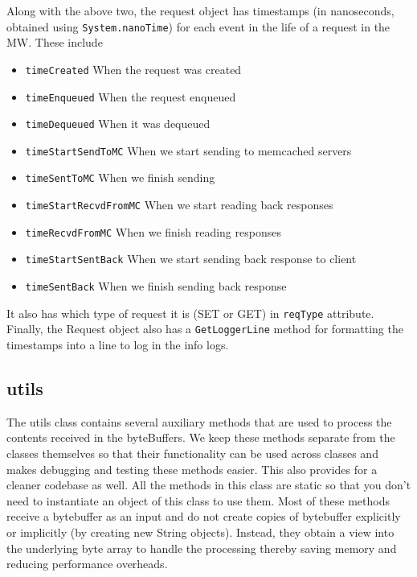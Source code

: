 \documentclass[11pt,a4paper]{article}
\begin{document}
Along with the above two, the request object 	has timestamps (in nanoseconds, obtained using \texttt{System.nanoTime}) for each event in the life of a request in the MW. These include
\begin{itemize}
	  \setlength{\itemsep}{0pt}
	  \setlength{\parskip}{0pt}
	  \setlength{\parsep}{0pt}
	\item \texttt{timeCreated} When the request was created
	\item \texttt{timeEnqueued} When the request enqueued
	\item \texttt{timeDequeued} When it was dequeued
	\item \texttt{timeStartSendToMC} When we start sending to memcached servers
	\item \texttt{timeSentToMC} When we finish sending
	\item \texttt{timeStartRecvdFromMC} When we start reading back responses
	\item \texttt{timeRecvdFromMC} When we finish reading responses
	\item \texttt{timeStartSentBack} When we start sending back response to client 
	\item \texttt{timeSentBack} When we finish sending back response
\end{itemize}
It also has which type of request it is (SET or GET) in \texttt{reqType} attribute. \\


Finally, the Request object also has a \texttt{GetLoggerLine} method for formatting the timestamps into a line to log in the info logs.

\subsection{utils}
The utils class contains several auxiliary methods that are used to process the contents received in the byteBuffers. We keep these methods separate from the classes themselves so that their functionality can be used across classes and makes debugging and testing these methods easier. This also provides for a cleaner codebase as well. All the methods in this class are static so that you don’t need to instantiate an object of this class to use them.  Most of these methods receive a bytebuffer as an input and do not create copies of bytebuffer explicitly or implicitly  (by creating new String objects). Instead, they obtain a view into the underlying byte array to handle the processing thereby saving memory and reducing performance overheads.
\end{document}
